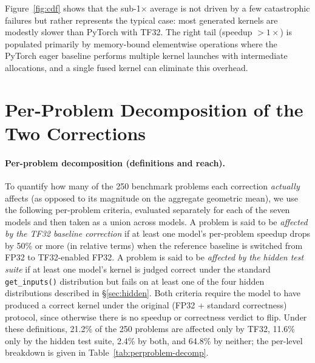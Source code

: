 \documentclass[11pt]{article}
\begin{document}
Figure~\ref{fig:cdf} shows that the sub-1$\times$ average is not driven by a few catastrophic failures but rather represents the typical case: most generated kernels are modestly slower than PyTorch with TF32. The right tail (speedup $>1\times$) is populated primarily by memory-bound elementwise operations where the PyTorch eager baseline performs multiple kernel launches with intermediate allocations, and a single fused kernel can eliminate this overhead.

\section{Per-Problem Decomposition of the Two Corrections}
\label{app:perproblem-decomp}

\paragraph{Per-problem decomposition (definitions and reach).} To quantify how many of the 250 benchmark problems each correction \emph{actually} affects (as opposed to its magnitude on the aggregate geometric mean), we use the following per-problem criteria, evaluated separately for each of the seven models and then taken as a union across models. A problem is said to be \emph{affected by the TF32 baseline correction} if at least one model's per-problem speedup drops by 50\% or more (in relative terms) when the reference baseline is switched from FP32 to TF32-enabled FP32. A problem is said to be \emph{affected by the hidden test suite} if at least one model's kernel is judged correct under the standard \texttt{get\_inputs()} distribution but fails on at least one of the four hidden distributions described in \S\ref{sec:hidden}. Both criteria require the model to have produced a correct kernel under the original (FP32 + standard correctness) protocol, since otherwise there is no speedup or correctness verdict to flip. Under these definitions, 21.2\% of the 250 problems are affected only by TF32, 11.6\% only by the hidden test suite, 2.4\% by both, and 64.8\% by neither; the per-level breakdown is given in Table~\ref{tab:perproblem-decomp}.
\end{document}
